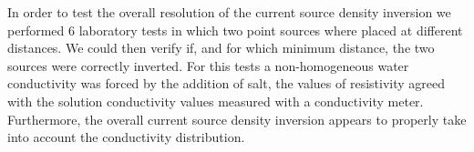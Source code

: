 \documentclass{article}
\begin{document}
\clearpage

In order to test the overall resolution of the current source density inversion we performed 6 laboratory tests in which two point sources where placed at different distances. We could then verify if, and for which minimum distance, the two sources were correctly inverted. For this tests a non-homogeneous water conductivity was forced by the addition of salt, the values of resistivity agreed with the solution conductivity values measured with a conductivity meter. Furthermore, the overall current source density inversion appears to properly take into account the conductivity distribution.

\begin{figure}[h]
	\centering
	\captionsetup[sub]{margin=0.4cm}

\end{figure}
\end{document}
